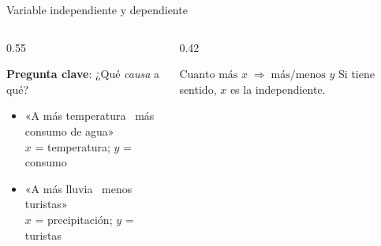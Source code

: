 \documentclass[aspectratio=169, 10pt, spanish]{beamer}
\begin{document}
\begin{frame}{Variable independiente y dependiente}
  \begin{columns}[T]
    \begin{column}{0.55\textwidth}
      \begin{ejemplobox}
        \AlmFontSmall
        \textbf{Pregunta clave}: ¿Qué \textit{causa} a qué?
        \begin{itemize}
          \item «A más temperatura \textrightarrow\ más consumo de agua»\\
            $x$ = temperatura; $y$ = consumo
          \item «A más lluvia \textrightarrow\ menos turistas»\\
            $x$ = precipitación; $y$ = turistas
        \end{itemize}
      \end{ejemplobox}
    \end{column}
    \begin{column}{0.42\textwidth}
      \begin{notabox}
        \AlmFontSmall
        $\text{Cuanto más } x \;\Rightarrow\; \text{más/menos } y$
        Si tiene sentido, \(x\) es la independiente.
      \end{notabox}
    \end{column}
  \end{columns}
\end{frame}
\end{document}
